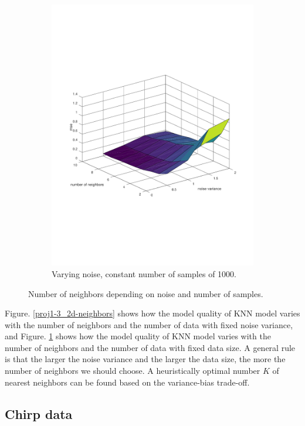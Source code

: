 \documentclass[]{article}
\begin{document}
\begin{figure}[ht]
\begin{subfigure}{.49\textwidth}
	\includegraphics[trim= 10cm 5cm 10cm 5cm, scale=0.4]{proj1-3_2d-noise}
	\caption{Varying noise, constant number of samples of 1000.}
	\label{proj1-3_2d-noise}
\end{subfigure}
\caption{Number of neighbors depending on noise and number of samples.}
\label{proj1-3_2d}
\end{figure}

Figure. \ref{proj1-3_2d-neighbors} shows how the model quality of KNN model varies with the number of neighbors and the number of data with fixed noise variance, and Figure. \ref{proj1-3_2d-noise} shows how the model quality of KNN model varies with the number of neighbors and the number of data with fixed data size. A general rule is that the larger the noise variance and the larger the data size, the more the number of neighbors we should choose. A heuristically optimal number $K$ of nearest neighbors can be found based on the variance-bias trade-off. 

\subsection{Chirp data}
\end{document}
